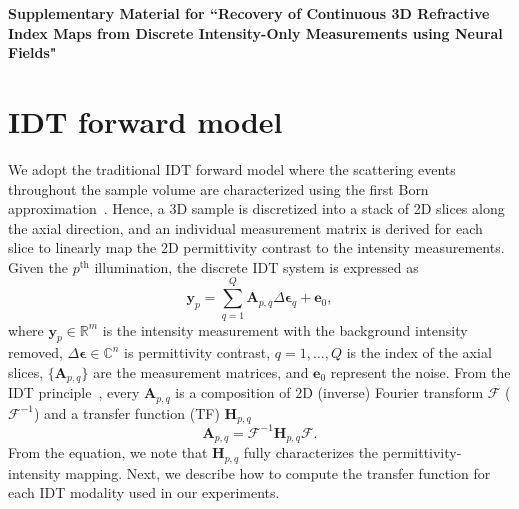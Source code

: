 \documentclass[11pt]{article}
\theoremstyle{plain} %
\def\ebm{{\bm{e}}}
\def\ybm{{\bm{y}}}
\def\Abm{{\bm{A}}}
\def\Hbm{{\bm{H}}}
\def\C{\mathbb{C}}
\def\R{\mathbb{R}}
\def\epsilonbm{\bm{\epsilon}}
\begin{document}
\newpage

{\centering\LARGE \textbf{Supplementary Material for ``Recovery of Continuous 3D Refractive Index Maps from Discrete Intensity-Only Measurements using Neural Fields"}}

\section*{IDT forward model}

We adopt the traditional IDT forward model where the scattering events throughout the sample volume are characterized using the first Born approximation~\cite{Wolf1969}.
Hence, a 3D sample is discretized into a stack of 2D slices along the axial direction, and an individual measurement matrix is derived for each slice to linearly map the 2D permittivity contrast to the intensity measurements.
Given the $p^\text{th}$ illumination, the discrete IDT system is expressed as
\begin{equation}
\ybm_p = \sum_{q=1}^Q \Abm_{p,q}\Delta\epsilonbm_q + \ebm_0,
\end{equation}
where $\ybm_p\in\R^m$ is the intensity measurement with the background intensity removed, $\Delta\epsilonbm\in\C^{n}$ is permittivity contrast, $q=1,\dots,Q$ is the index of the axial slices, $\{\Abm_{p,q}\}$ are the measurement matrices, and $\ebm_0$ represent the noise.
From the IDT principle~\cite{Ling.etal18}, every $\Abm_{p,q}$ is a composition of $2$D (inverse) Fourier transform $\mathscr{F}$ ($\mathscr{F}^{-1}$) and a transfer function (TF) $\Hbm_{p,q}$ 
\begin{equation}
\Abm_{p,q} = \mathscr{F}^{-1} \Hbm_{p,q} \mathscr{F}.
\end{equation}
From the equation, we note that $\Hbm_{p,q}$ fully characterizes the permittivity-intensity mapping. 
Next, we describe how to compute the transfer function for each IDT modality used in our experiments.
\end{document}
